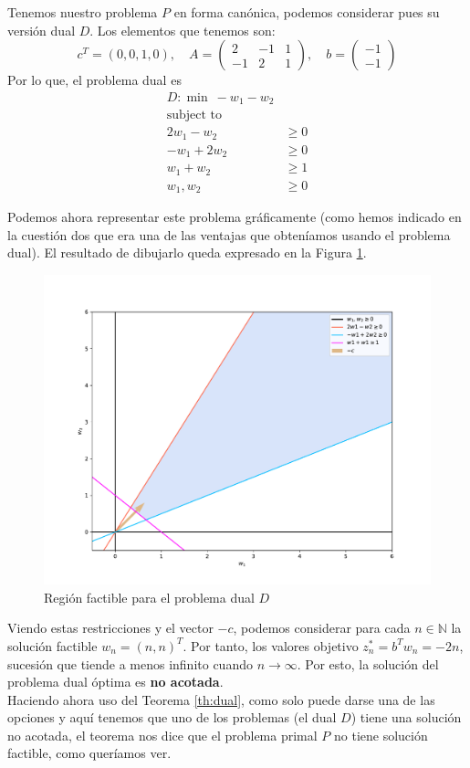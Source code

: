\documentclass[a4paper]{article}
\begin{document}
Tenemos nuestro problema \(P\) en forma canónica, podemos considerar pues su versión dual \(D\).  Los elementos que tenemos son:
\[
c^{T} = (0,0,1,0), \quad A = \begin{pmatrix} 2 & -1 & 1 \\ -1 & 2 & 1 \end{pmatrix},\quad b = \begin{pmatrix} -1 \\ -1\end{pmatrix}
\]
Por lo que, el problema dual es
\begin{align*}
  D: \min \ -w_{1} - w_{2}& \\
  \text{subject to}\\
  2w_{1} - w_{2} & \geq 0\\
  -w_{1} + 2w_{2}& \geq 0\\
  w_{1} + w_{2} & \geq 1\\
  w_{1},w_{2} & \geq 0
\end{align*}

Podemos ahora representar este problema gráficamente (como hemos indicado en la cuestión dos que era una de las ventajas que obteníamos usando el problema dual). El resultado de dibujarlo queda expresado en la Figura \ref{fig:dual}.

\begin{figure}[H]
  \centering
  \includegraphics[scale=0.4]{Ej4}
  \caption{Región factible para el problema dual \(D\)}
  \label{fig:dual}
\end{figure}

Viendo estas restricciones y el vector \(-c\), podemos considerar para cada \(n \in \mathbb N\) la solución factible \(w_{n} = (n,n)^{T}\). Por tanto, los valores objetivo \(z_{n}^{*} = b^{T}w_{n} = -2n\), sucesión que tiende a menos infinito cuando \(n \to \infty\). Por esto, la solución del problema dual óptima es \textbf{no acotada}.\\

Haciendo ahora uso del Teorema \ref{th:dual}, como solo puede darse una de las opciones y aquí tenemos que uno de los problemas (el dual \(D\)) tiene una solución no acotada, el teorema nos dice que el problema primal \(P\) no tiene solución factible, como queríamos ver.
\end{document}
